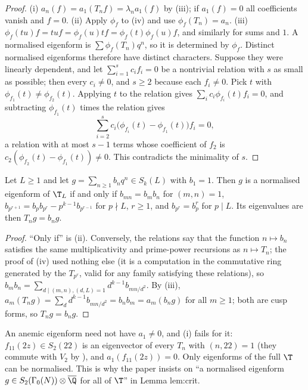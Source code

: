 \begin{proof}
(i) $a_n(f)=a_1(T_nf)=\lambda_na_1(f)$ by (iii); if $a_1(f)=0$ all coefficients vanish and $f=0$. (ii) Apply $\phi_f$ to (iv) and use
$\phi_f(T_n)=a_n$. (iii) $\phi_f(tu)f=tuf=\phi_f(u)tf=\phi_f(t)\phi_f(u)f$, and similarly for sums and $1$. A normalised eigenform is $\sum\phi_f(T_n)q^n$, so it is determined by $\phi_f$.
Distinct normalised eigenforms therefore have distinct characters. Suppose they were linearly dependent, and let $\sum_{i=1}^sc_if_i=0$ be a nontrivial relation with $s$ as
small as possible; then every $c_i\ne0$, and $s\ge2$ because each $f_i\ne0$. Pick $t$ with $\phi_{f_1}(t)\ne\phi_{f_2}(t)$. Applying $t$ to the relation gives $\sum_ic_i\phi_{f_i}(t)f_i=0$,
and subtracting $\phi_{f_1}(t)$ times the relation gives
\[
\sum_{i=2}^sc_i\bigl(\phi_{f_i}(t)-\phi_{f_1}(t)\bigr)f_i=0,
\]
a relation with at most $s-1$ terms whose coefficient of $f_2$ is $c_2(\phi_{f_2}(t)-\phi_{f_1}(t))\ne0$. This contradicts the minimality of $s$.
\end{proof}

\begin{lemma}\label{lem:hecke:eigen-criterion}
Let $L\ge1$ and let $g=\sum_{n\ge1}b_nq^n\in S_k(L)$ with $b_1=1$. Then $g$ is a normalised eigenform of $\T_L$ if and only if $b_{mn}=b_mb_n$ for $(m,n)=1$, $b_{p^{r+1}}=b_pb_{p^r}-p^{k-1}b_{p^{r-1}}$
for $p\nmid L$, $r\ge1$, and $b_{p^r}=b_p^r$ for $p\mid L$. Its eigenvalues are then $T_ng=b_ng$.
\end{lemma}

\begin{proof}
``Only if'' is (ii). Conversely, the relations say that the function $n\mapsto b_n$ satisfies the same multiplicativity and prime-power recursions as
$n\mapsto T_n$; the proof of (iv) used nothing else (it is a computation in the commutative ring generated by the $T_{p^r}$, valid for any family satisfying
these relations), so $b_mb_n=\sum_{d\mid(m,n),(d,L)=1}d^{k-1}b_{mn/d^2}$. By (iii), $a_m(T_ng)=\sum_{d}d^{k-1}b_{mn/d^2}=b_nb_m=a_m(b_ng)$ for all $m\ge1$; both are
cusp forms, so $T_ng=b_ng$.
\end{proof}

\begin{warning}\label{warn:hecke:anemic}
An anemic eigenform need not have $a_1\ne0$, and (i) fails for it: $f_{11}(2z)\in S_2(22)$ is an eigenvector of every $T_n$ with $(n,22)=1$ (they commute with
$V_2$ by ), and $a_1(f_{11}(2z))=0$. Only eigenforms of the full $\T$ can be normalised. This is why the paper insists on ``a normalised eigenform $g\in
S_2(\Gamma_0(N))\otimes\overline\Q$ for all of $\T$'' in Lemma lem:crit.
\end{warning}

